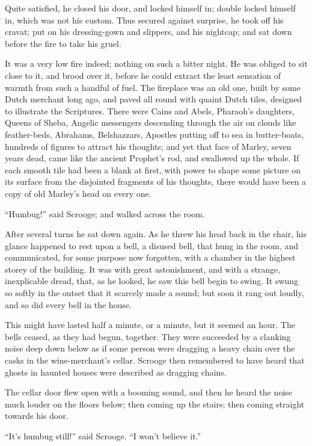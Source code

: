 \documentclass[paper=a5,BCOR=15mm,twoside,DIV=15,headinclude=off,12pt,chapterprefix=off,openany,headings=huge]{scrbook} %
\begin{document}
Quite satisfied, he closed his door, and locked himself in; double locked himself in, which was not his custom. Thus secured against surprise, he took off his cravat; put on his dressing-gown and slippers, and his nightcap; and sat down before the fire to take his gruel.

It was a very low fire indeed; nothing on such a bitter night. He was obliged to sit close to it, and brood over it, before he could extract the least sensation of warmth from such a handful of fuel. The fireplace was an old one, built by some Dutch merchant long ago, and paved all round with quaint Dutch tiles, designed to illustrate the Scriptures. There were Cains and Abels, Pharaoh's daughters, Queens of Sheba, Angelic messengers descending through the air on clouds like feather-beds, Abrahams, Belshazzars, Apostles putting off to sea in butter-boats, hundreds of figures to attract his thoughts; and yet that face of Marley, seven years dead, came like the ancient Prophet's rod, and swallowed up the whole. If each smooth tile had been a blank at first, with power to shape some picture on its surface from the disjointed fragments of his thoughts, there would have been a copy of old Marley's head on every one.

\enquote{Humbug!} said Scrooge; and walked across the room.

After several turns he sat down again. As he threw his head back in the chair, his glance happened to rest upon a bell, a disused bell, that hung in the room, and communicated, for some purpose now forgotten, with a chamber in the highest storey of the building. It was with great astonishment, and with a strange, inexplicable dread, that, as he looked, he saw this bell begin to swing. It swung so softly in the outset that it scarcely made a sound; but soon it rang out loudly, and so did every bell in the house.

This might have lasted half a minute, or a minute, but it seemed an hour. The bells ceased, as they had begun, together. They were succeeded by a clanking noise deep down below as if some person were dragging a heavy chain over the casks in the wine-merchant's cellar. Scrooge then remembered to have heard that ghosts in haunted houses were described as dragging chains.

The cellar door flew open with a booming sound, and then he heard the noise much louder on the floors below; then coming up the stairs; then coming straight towards his door.

\enquote{It's humbug still!} said Scrooge. \enquote{I won't believe it.}
\end{document}
